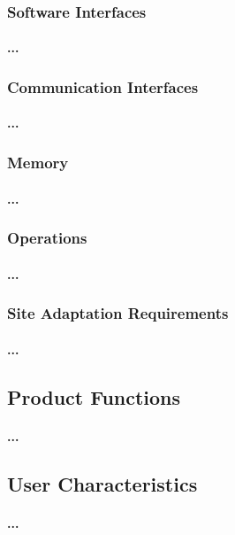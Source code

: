 \documentclass[runningheads,a4paper]{llncs}
\begin{document}
\subsubsection{Software Interfaces}
\paragraph{...}
\subsubsection{Communication Interfaces}
\paragraph{...}
\subsubsection{Memory}
\paragraph{...}
\subsubsection{Operations}
\paragraph{...}
\subsubsection{Site Adaptation Requirements}
\paragraph{...}

\subsection{Product Functions}
\paragraph{...}
\subsection{User Characteristics}
\paragraph{...}
\end{document}
